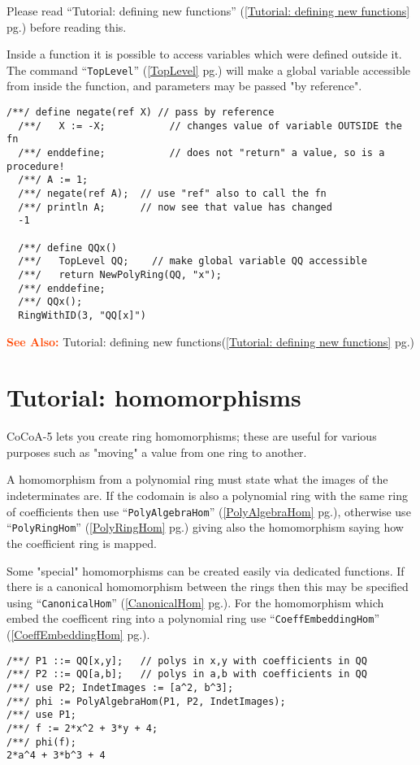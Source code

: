 \documentclass[a4paper]{mybook}
\newcommand\SeeAlso{\par\textcolor{OrangeRed}{\textbf{\large See Also: }}}
\begin{document}
        
Please read ``Tutorial: defining new functions'' (\ref{Tutorial: defining new functions} pg.\pageref{Tutorial: defining new functions}) before reading this.
\par 
Inside a function it is possible to access variables which were
defined outside it.  The command ``\verb&TopLevel&'' (\ref{TopLevel} pg.\pageref{TopLevel}) will make a global
variable accessible from inside the function, and parameters may be passed
"by reference".
\begin{Verbatim}[label=example, rulecolor=\color{PineGreen}, frame=single]
  /**/ define negate(ref X) // pass by reference
  /**/   X := -X;           // changes value of variable OUTSIDE the fn
  /**/ enddefine;           // does not "return" a value, so is a procedure!
  /**/ A := 1;
  /**/ negate(ref A);  // use "ref" also to call the fn
  /**/ println A;      // now see that value has changed
  -1

  /**/ define QQx()
  /**/   TopLevel QQ;    // make global variable QQ accessible
  /**/   return NewPolyRing(QQ, "x");
  /**/ enddefine;
  /**/ QQx();
  RingWithID(3, "QQ[x]")  
\end{Verbatim}


\SeeAlso %
  Tutorial: defining new functions(\ref{Tutorial: defining new functions} pg.\pageref{Tutorial: defining new functions})

\section{Tutorial: homomorphisms}
\label{Tutorial: homomorphisms}

        
CoCoA-5 lets you create ring homomorphisms; these are useful for
various purposes such as "moving" a value from one ring to another.
\par 
A homomorphism from a polynomial ring must state what the images
of the indeterminates are.  If the codomain is also a polynomial
ring with the same ring of coefficients then use ``\verb&PolyAlgebraHom&'' (\ref{PolyAlgebraHom} pg.\pageref{PolyAlgebraHom}),
otherwise use ``\verb&PolyRingHom&'' (\ref{PolyRingHom} pg.\pageref{PolyRingHom}) giving also the homomorphism saying
how the coefficient ring is mapped. 
\par 
Some "special" homomorphisms can be created easily via dedicated functions.
If there is a canonical homomorphism between the rings then this
may be specified using ``\verb&CanonicalHom&'' (\ref{CanonicalHom} pg.\pageref{CanonicalHom}).
For the homomorphism which embed the coefficent ring into a polynomial
ring use ``\verb&CoeffEmbeddingHom&'' (\ref{CoeffEmbeddingHom} pg.\pageref{CoeffEmbeddingHom}).
\begin{Verbatim}[label=example, rulecolor=\color{PineGreen}, frame=single]
/**/ P1 ::= QQ[x,y];   // polys in x,y with coefficients in QQ
/**/ P2 ::= QQ[a,b];   // polys in a,b with coefficients in QQ
/**/ use P2; IndetImages := [a^2, b^3];
/**/ phi := PolyAlgebraHom(P1, P2, IndetImages);
/**/ use P1;
/**/ f := 2*x^2 + 3*y + 4;
/**/ phi(f);
2*a^4 + 3*b^3 + 4
\end{Verbatim}
\end{document}
